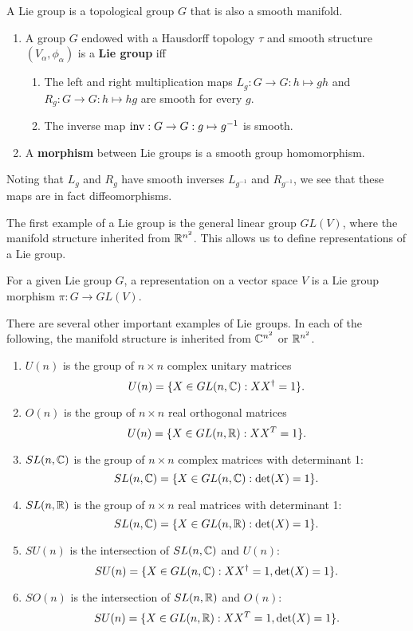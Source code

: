 \documentclass[a4paper]{article}
\begin{document}
A Lie group is a topological group $G$ that is also a smooth manifold. 

\begin{defi}\end{defi}
\begin{enumerate}
    \item A group $G$ endowed with a Hausdorff topology $\tau$ and smooth structure $(V_\alpha, \phi_\alpha)$ is a \textbf{Lie group} iff
    \begin{enumerate}
        \item The left and right multiplication maps $L_g : G \to G : h \mapsto gh$ and $R_g : G \to G : h \mapsto hg$ are smooth for every $g$.
        \item The inverse map $\operatorname{inv}: G \to G : g \mapsto g^{-1}$  is smooth.
    \end{enumerate}
    \item A \textbf{morphism} between Lie groups is a smooth group homomorphism.
\end{enumerate}

Noting that $L_g$ and $R_g$ have smooth inverses $L_{g^{-1}}$ and $R_{g^{-1}}$, we see that these maps are in fact diffeomorphisms.

The first example of a Lie group is the general linear group $GL(V)$, where the manifold structure inherited from $\mathbb{R}^{n^2}$. This allows us to define representations of a Lie group.

\begin{defi}
    For a given Lie group $G$, a representation on a vector space $V$ is a Lie group morphism $\pi: G \to GL(V)$.
\end{defi}

There are several other important examples of Lie groups. In each of the following, the manifold structure is inherited from $\mathbb{C}^{n^2}$ or $\mathbb{R}^{n^2}$. 

\begin{enumerate}
    \item $U(n)$ is the group of $n\times n$ complex unitary matrices 
    $$U(n) = \{X \in GL(n, \mathbb{C}) : XX^\dagger = 1\}.$$
    \item $O(n)$ is the group of $n\times n$ real orthogonal matrices 
    $$U(n) = \{X \in GL(n, \mathbb{R}) : XX^T = 1\}.$$
    \item $SL(n, \mathbb{C})$ is the group of $n\times n$ complex matrices with determinant 1:
    $$SL(n, \mathbb{C}) = \{X \in GL(n, \mathbb{C}) : \det(X) = 1\}.$$
    \item $SL(n, \mathbb{R})$ is the group of $n\times n$ real matrices with determinant 1:
    $$SL(n, \mathbb{C}) = \{X \in GL(n, \mathbb{R}) : \det(X) = 1\}.$$
    \item $SU(n)$ is the intersection of $SL(n, \mathbb{C})$ and $U(n)$:
    $$SU(n) = \{X \in GL(n, \mathbb{C}) : XX^\dagger = 1, \det(X) = 1\}.$$
    \item $SO(n)$ is the intersection of $SL(n, \mathbb{R})$ and $O(n)$:
    $$SU(n) = \{X \in GL(n, \mathbb{R}) : XX^T = 1, \det(X) = 1\}.$$
\end{enumerate}
\end{document}
